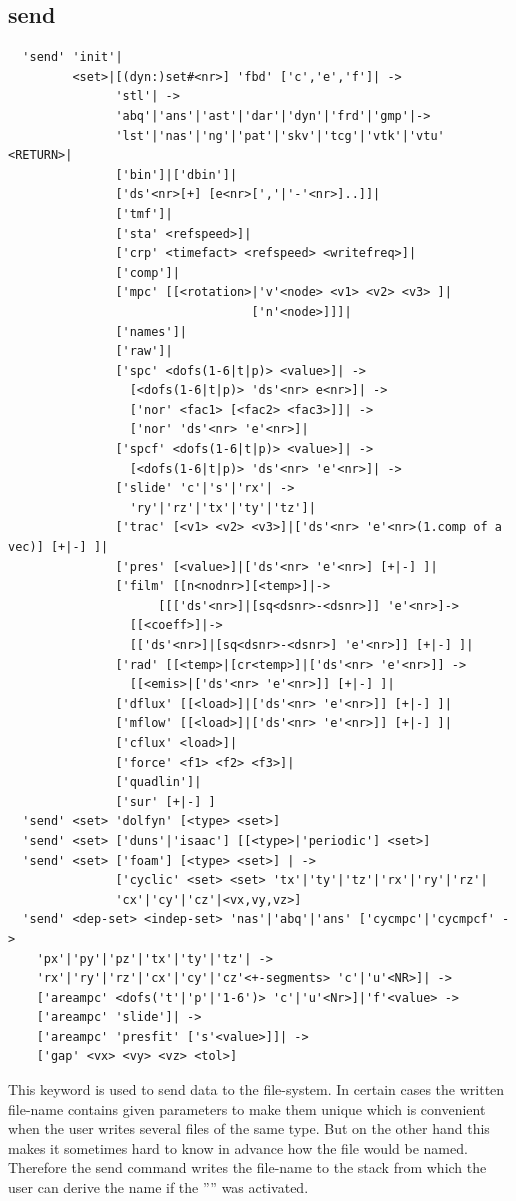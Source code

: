\documentclass{article}
\begin{document}
\subsection{\label{send}send}
\begin{verbatim}
  'send' 'init'|
         <set>|[(dyn:)set#<nr>] 'fbd' ['c','e','f']| ->
               'stl'| ->
               'abq'|'ans'|'ast'|'dar'|'dyn'|'frd'|'gmp'|->
               'lst'|'nas'|'ng'|'pat'|'skv'|'tcg'|'vtk'|'vtu' <RETURN>|
               ['bin']|['dbin']|
               ['ds'<nr>[+] [e<nr>[','|'-'<nr>]..]]|
               ['tmf']|
               ['sta' <refspeed>]|
               ['crp' <timefact> <refspeed> <writefreq>]|
               ['comp']|
               ['mpc' [[<rotation>|'v'<node> <v1> <v2> <v3> ]|
                                  ['n'<node>]]]|
               ['names']|
               ['raw']|
               ['spc' <dofs(1-6|t|p)> <value>]| ->
                 [<dofs(1-6|t|p)> 'ds'<nr> e<nr>]| ->
                 ['nor' <fac1> [<fac2> <fac3>]]| ->
                 ['nor' 'ds'<nr> 'e'<nr>]|
               ['spcf' <dofs(1-6|t|p)> <value>]| ->
                 [<dofs(1-6|t|p)> 'ds'<nr> 'e'<nr>]| ->
               ['slide' 'c'|'s'|'rx'| ->
                 'ry'|'rz'|'tx'|'ty'|'tz']|
               ['trac' [<v1> <v2> <v3>]|['ds'<nr> 'e'<nr>(1.comp of a vec)] [+|-] ]|
               ['pres' [<value>]|['ds'<nr> 'e'<nr>] [+|-] ]|
               ['film' [[n<nodnr>][<temp>]|->
                     [[['ds'<nr>]|[sq<dsnr>-<dsnr>]] 'e'<nr>]->
                 [[<coeff>]|->
                 [['ds'<nr>]|[sq<dsnr>-<dsnr>] 'e'<nr>]] [+|-] ]| 
               ['rad' [[<temp>|[cr<temp>]|['ds'<nr> 'e'<nr>]] ->
                 [[<emis>|['ds'<nr> 'e'<nr>]] [+|-] ]|
               ['dflux' [[<load>]|['ds'<nr> 'e'<nr>]] [+|-] ]|
               ['mflow' [[<load>]|['ds'<nr> 'e'<nr>]] [+|-] ]|
               ['cflux' <load>]| 
               ['force' <f1> <f2> <f3>]|
               ['quadlin']|
               ['sur' [+|-] ]
  'send' <set> 'dolfyn' [<type> <set>] 
  'send' <set> ['duns'|'isaac'] [[<type>|'periodic'] <set>] 
  'send' <set> ['foam'] [<type> <set>] | ->
               ['cyclic' <set> <set> 'tx'|'ty'|'tz'|'rx'|'ry'|'rz'|
               'cx'|'cy'|'cz'|<vx,vy,vz>] 
  'send' <dep-set> <indep-set> 'nas'|'abq'|'ans' ['cycmpc'|'cycmpcf' ->
    'px'|'py'|'pz'|'tx'|'ty'|'tz'| ->
    'rx'|'ry'|'rz'|'cx'|'cy'|'cz'<+-segments> 'c'|'u'<NR>]| ->
    ['areampc' <dofs('t'|'p'|'1-6')> 'c'|'u'<Nr>]|'f'<value> ->
    ['areampc' 'slide']| ->
    ['areampc' 'presfit' ['s'<value>]]| ->
    ['gap' <vx> <vy> <vz> <tol>] 
\end{verbatim}
This keyword is used to send data to the file-system. In certain cases the written file-name contains given parameters to make them unique which is convenient when the user writes several files of the same type. But on the other hand this makes it sometimes hard to know in advance how the file would be named. Therefore the send command writes the file-name to the stack from which the user can derive the name if the '''' was activated.
\end{document}
